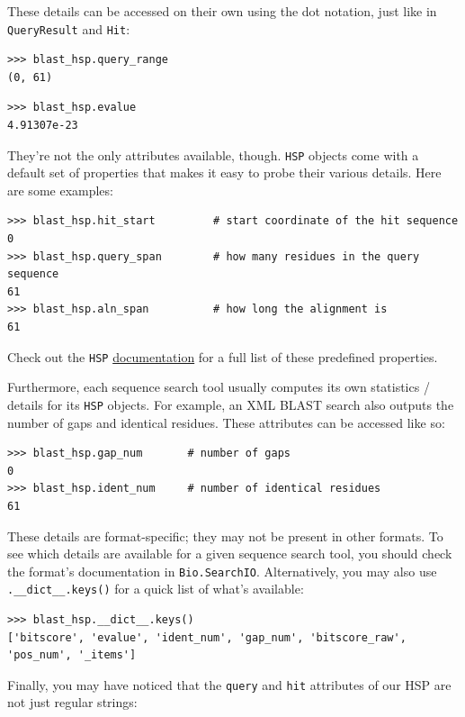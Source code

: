\documentclass{report}
\begin{document}
These details can be accessed on their own using the dot notation, just like in
\verb|QueryResult| and \verb|Hit|:

\begin{verbatim}
>>> blast_hsp.query_range
(0, 61)
\end{verbatim}
\begin{verbatim}
>>> blast_hsp.evalue
4.91307e-23
\end{verbatim}

They're not the only attributes available, though. \verb|HSP| objects come with
a default set of properties that makes it easy to probe their various
details. Here are some examples:

\begin{verbatim}
>>> blast_hsp.hit_start         # start coordinate of the hit sequence
0
>>> blast_hsp.query_span        # how many residues in the query sequence
61
>>> blast_hsp.aln_span          # how long the alignment is
61
\end{verbatim}

Check out the \verb|HSP|
\href{http://biopython.org/DIST/docs/api/Bio.SearchIO._model.hsp-module.html}{documentation}
for a full list of these predefined properties.

Furthermore, each sequence search tool usually computes its own statistics /
details for its \verb|HSP| objects. For example, an XML BLAST search also
outputs the number of gaps and identical residues. These attributes can be
accessed like so:

\begin{verbatim}
>>> blast_hsp.gap_num       # number of gaps
0
>>> blast_hsp.ident_num     # number of identical residues
61
\end{verbatim}

These details are format-specific; they may not be present in other formats.
To see which details are available for a given sequence search tool, you
should check the format's documentation in \verb|Bio.SearchIO|. Alternatively,
you may also use \verb|.__dict__.keys()| for a quick list of what's available:

\begin{verbatim}
>>> blast_hsp.__dict__.keys()
['bitscore', 'evalue', 'ident_num', 'gap_num', 'bitscore_raw', 'pos_num', '_items']
\end{verbatim}

Finally, you may have noticed that the \verb|query| and \verb|hit| attributes
of our HSP are not just regular strings:
\end{document}
